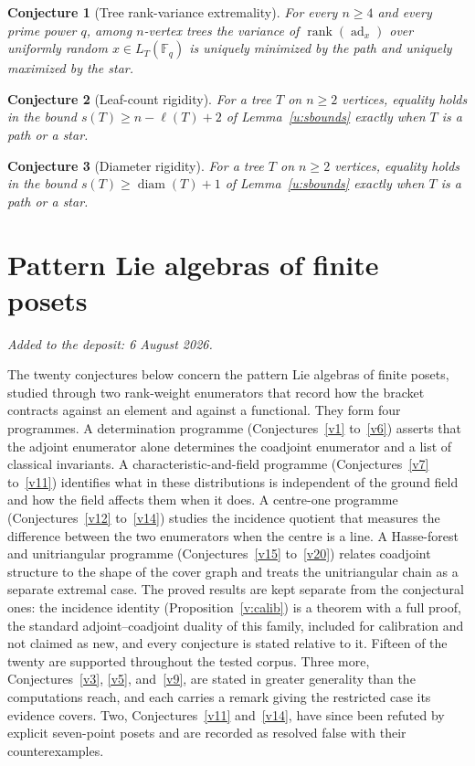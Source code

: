 \documentclass[11pt]{article}
\newtheorem{conjecture}{Conjecture}
\theoremstyle{definition}
\newcommand{\rank}{\operatorname{rank}}
\newcommand{\Fq}{\mathbb F}
\begin{document}
\begin{conjecture}[Tree rank-variance extremality]\label{u18}
For every $n\ge4$ and every prime power $q$, among $n$-vertex trees the variance of $\rank(\operatorname{ad}_x)$ over uniformly random $x\in L_T(\Fq_q)$ is uniquely minimized by the path and uniquely maximized by the star.
\end{conjecture}

\begin{conjecture}[Leaf-count rigidity]\label{u19}
For a tree $T$ on $n\ge2$ vertices, equality holds in the bound $s(T)\ge n-\ell(T)+2$ of Lemma~\ref{u:sbounds} exactly when $T$ is a path or a star.
\end{conjecture}

\begin{conjecture}[Diameter rigidity]\label{u20}
For a tree $T$ on $n\ge2$ vertices, equality holds in the bound $s(T)\ge\operatorname{diam}(T)+1$ of Lemma~\ref{u:sbounds} exactly when $T$ is a path or a star.
\end{conjecture}


\part{Pattern Lie algebras of finite posets}

\medskip\noindent\emph{Added to the deposit: 6 August 2026.}\par\medskip

The twenty conjectures below concern the pattern Lie algebras of finite posets, studied through two rank-weight enumerators that record how the bracket contracts against an element and against a functional.  They form four programmes.  A determination programme (Conjectures~\ref{v1} to~\ref{v6}) asserts that the adjoint enumerator alone determines the coadjoint enumerator and a list of classical invariants.  A characteristic-and-field programme (Conjectures~\ref{v7} to~\ref{v11}) identifies what in these distributions is independent of the ground field and how the field affects them when it does.  A centre-one programme (Conjectures~\ref{v12} to~\ref{v14}) studies the incidence quotient that measures the difference between the two enumerators when the centre is a line.  A Hasse-forest and unitriangular programme (Conjectures~\ref{v15} to~\ref{v20}) relates coadjoint structure to the shape of the cover graph and treats the unitriangular chain as a separate extremal case.  The proved results are kept separate from the conjectural ones: the incidence identity (Proposition~\ref{v:calib}) is a theorem with a full proof, the standard adjoint--coadjoint duality of this family, included for calibration and not claimed as new, and every conjecture is stated relative to it.  Fifteen of the twenty are supported throughout the tested corpus.  Three more, Conjectures~\ref{v3}, \ref{v5}, and~\ref{v9}, are stated in greater generality than the computations reach, and each carries a remark giving the restricted case its evidence covers.  Two, Conjectures~\ref{v11} and~\ref{v14}, have since been refuted by explicit seven-point posets and are recorded as resolved false with their counterexamples.
\end{document}
